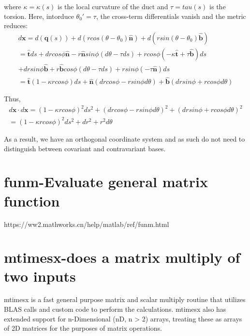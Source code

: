 \documentclass{Note}
\begin{document}
where $\kappa=\kappa(s)$ is the local curvature of the duct and $\tau=tau(s)$ is the torsion. Here, intorduce $\theta_0'=\tau$, the cross-term differentials vanish and the metric reduces:
\begin{equation}
\begin{aligned}
d\textbf{x}=d(\textbf{q}(s))+d(rcos(\theta-\theta_0) \widehat{\textbf{n}})+d(rsin(\theta-\theta_0)\widehat{\textbf{b}})\\
=\widehat{\textbf{t}}ds +dr cos\phi \widehat{\textbf{n}}-r\widehat{\textbf{n}} sin\phi (d\theta-\tau ds)+r cos\phi (-\kappa \widehat{\textbf{t}}+\tau \widehat{\textbf{b}})ds\\
+dr sin\phi \widehat{\textbf{b}}+r\widehat{\textbf{b}} cos\phi (d\theta-\tau ds)+r sin\phi (-\tau \widehat{\textbf{n}})ds\\
=\widehat{\textbf{t}}(1-\kappa r cos\phi)ds+\widehat{\textbf{n}}(dr cos\phi-rsin\phi d\theta)+\widehat{\textbf{b}}(dr sin\phi+rcos\phi d\theta)
\end{aligned}
\end{equation}

Thus,
\begin{equation}
\begin{aligned}
d\textbf{x}\cdot d\textbf{x}
={(1-\kappa r cos\phi)}^2ds^2+{(dr cos\phi-rsin\phi d\theta)}^2+{(dr sin\phi+rcos\phi d\theta)}^2\\
={(1-\kappa r cos\phi)}^2ds^2+dr^2+r^2d\theta
\end{aligned}
\end{equation}

As a result, we have an orthogonal coordinate system and as such do not need to distinguish between covariant and contravariant bases.






\section{funm-Evaluate general matrix function}

https://ww2.mathworks.cn/help/matlab/ref/funm.html


\section{mtimesx-does a matrix multiply of two inputs}

 mtimesx is a fast general purpose matrix and scalar multiply routine that utilizes BLAS calls and custom code to perform the calculations. mtimesx also has extended  support for n-Dimensional (nD, n > 2) arrays, treating these as arrays of 2D matrices for the purposes of matrix operations.
 
\end{document}
